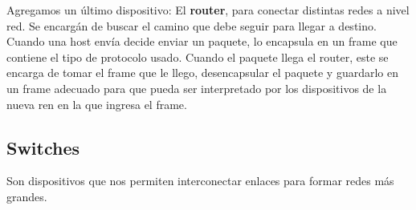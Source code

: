 Agregamos un último dispositivo: El \textbf{router}, para conectar distintas redes a nivel red. Se encargán de buscar el camino que debe seguir para llegar a destino. Cuando una host envía decide enviar un paquete, lo encapsula en un frame que contiene el tipo de protocolo usado. Cuando el paquete llega el router, este se encarga de tomar el frame que le llego, desencapsular el paquete y guardarlo en un frame adecuado para que pueda ser interpretado por los dispositivos de la nueva ren en la que ingresa el frame.

\subsection{Switches}
Son dispositivos que nos permiten interconectar enlaces para formar redes más grandes. 
